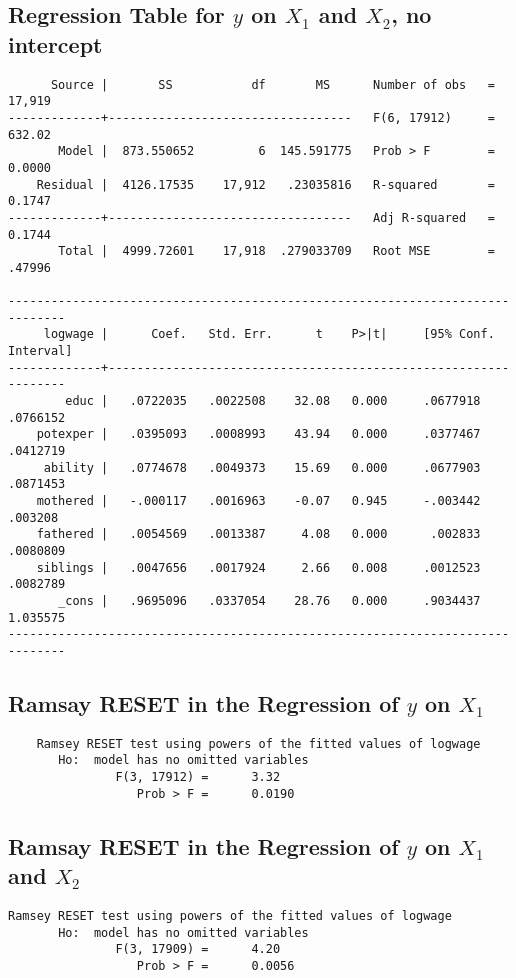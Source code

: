 \documentclass{article}
\begin{document}
\newpage
\hypertarget{nointercept}{\subsection*{Regression Table for $y$ on $X_1$ and $X_2$, no intercept}}
\label{sec: table2}
\begin{verbatim}
      Source |       SS           df       MS      Number of obs   =    17,919
-------------+----------------------------------   F(6, 17912)     =    632.02
       Model |  873.550652         6  145.591775   Prob > F        =    0.0000
    Residual |  4126.17535    17,912   .23035816   R-squared       =    0.1747
-------------+----------------------------------   Adj R-squared   =    0.1744
       Total |  4999.72601    17,918  .279033709   Root MSE        =    .47996

------------------------------------------------------------------------------
     logwage |      Coef.   Std. Err.      t    P>|t|     [95% Conf. Interval]
-------------+----------------------------------------------------------------
        educ |   .0722035   .0022508    32.08   0.000     .0677918    .0766152
    potexper |   .0395093   .0008993    43.94   0.000     .0377467    .0412719
     ability |   .0774678   .0049373    15.69   0.000     .0677903    .0871453
    mothered |   -.000117   .0016963    -0.07   0.945     -.003442     .003208
    fathered |   .0054569   .0013387     4.08   0.000      .002833    .0080809
    siblings |   .0047656   .0017924     2.66   0.008     .0012523    .0082789
       _cons |   .9695096   .0337054    28.76   0.000     .9034437    1.035575
------------------------------------------------------------------------------

\end{verbatim}

\hypertarget{ramsay}{\subsection*{Ramsay RESET in the Regression of $y$ on $X_1$}}
\begin{verbatim}
	Ramsey RESET test using powers of the fitted values of logwage
       Ho:  model has no omitted variables
               F(3, 17912) =      3.32
                  Prob > F =      0.0190
\end{verbatim}
\subsection*{Ramsay RESET in the Regression of $y$ on $X_1$ and $X_2$}
\begin{verbatim}
Ramsey RESET test using powers of the fitted values of logwage
       Ho:  model has no omitted variables
               F(3, 17909) =      4.20
                  Prob > F =      0.0056
\end{verbatim}
\end{document}
